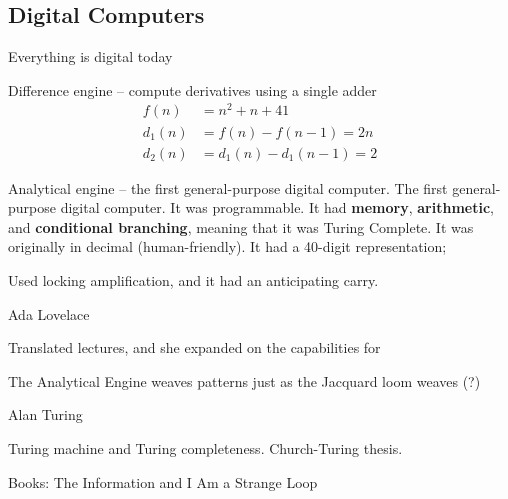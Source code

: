 \subsection{Digital Computers}
Everything is digital today

Difference engine -- compute derivatives using a single adder
\begin{align*}
    f(n) &= n^2 + n + 41\\
    d_1(n) &= f(n) - f(n-1) = 2n \\
    d_2(n) &= d_1(n) - d_1(n-1) = 2
\end{align*}

Analytical engine -- the first general-purpose digital computer.
The first general-purpose digital computer.
It was programmable.
It had \textbf{memory}, \textbf{arithmetic}, and \textbf{conditional branching}, meaning that it was Turing Complete.
It was originally in decimal (human-friendly).
It had a 40-digit representation;

Used locking amplification, and it had an anticipating carry.



Ada Lovelace

Translated lectures, and she expanded on the capabilities for

The Analytical Engine weaves patterns just as the Jacquard loom weaves (?)


Alan Turing

Turing machine and Turing completeness.
Church-Turing thesis.

Books: The Information and I Am a Strange Loop

